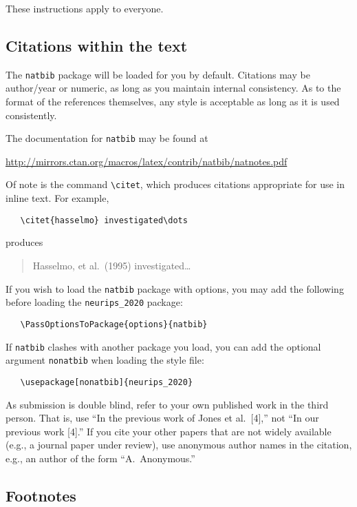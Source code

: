 \documentclass{article}
\begin{document}
These instructions apply to everyone.

\subsection{Citations within the text}

The \verb+natbib+ package will be loaded for you by default.  Citations may be
author/year or numeric, as long as you maintain internal consistency.  As to the
format of the references themselves, any style is acceptable as long as it is
used consistently.

The documentation for \verb+natbib+ may be found at
\begin{center}
  \url{http://mirrors.ctan.org/macros/latex/contrib/natbib/natnotes.pdf}
\end{center}
Of note is the command \verb+\citet+, which produces citations appropriate for
use in inline text.  For example,
\begin{verbatim}
   \citet{hasselmo} investigated\dots
\end{verbatim}
produces
\begin{quote}
  Hasselmo, et al.\ (1995) investigated\dots
\end{quote}

If you wish to load the \verb+natbib+ package with options, you may add the
following before loading the \verb+neurips_2020+ package:
\begin{verbatim}
   \PassOptionsToPackage{options}{natbib}
\end{verbatim}

If \verb+natbib+ clashes with another package you load, you can add the optional
argument \verb+nonatbib+ when loading the style file:
\begin{verbatim}
   \usepackage[nonatbib]{neurips_2020}
\end{verbatim}

As submission is double blind, refer to your own published work in the third
person. That is, use ``In the previous work of Jones et al.\ [4],'' not ``In our
previous work [4].'' If you cite your other papers that are not widely available
(e.g., a journal paper under review), use anonymous author names in the
citation, e.g., an author of the form ``A.\ Anonymous.''

\subsection{Footnotes}
\end{document}
